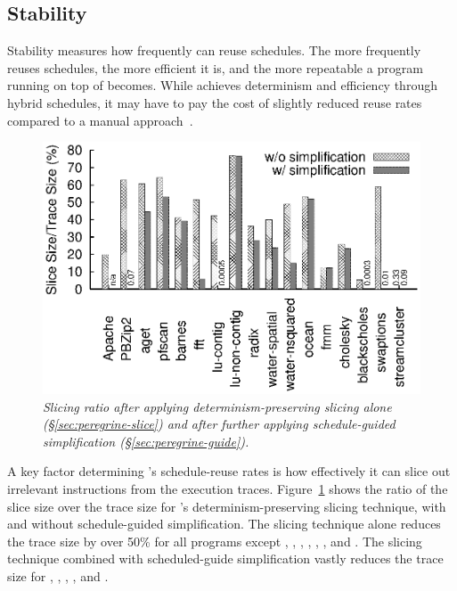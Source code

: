 \subsection{Stability} \label{sec:peregrine-stable}

Stability measures how frequently \peregrine can reuse schedules.  The more
frequently \peregrine reuses schedules, the more efficient it is, and the
more repeatable a program running on top of \peregrine becomes.  While \peregrine
achieves determinism and efficiency through hybrid schedules, it may have
to pay the cost of slightly reduced reuse rates compared to a
manual approach~\cite{cui:tern:osdi10}.




\begin{figure}[t]
\centering
\includegraphics[width=\columnwidth]{peregrine/figures/slicing.eps}
\vspace{-.3in}
\caption{{\em Slicing ratio after applying determinism-preserving slicing alone 
    (\S\ref{sec:peregrine-slice}) and after further applying schedule-guided
    simplification (\S\ref{sec:peregrine-guide}).}} \label{fig:peregrine-slice-ratio}
\vspace{-.05in}
\end{figure}

A key factor determining \peregrine's schedule-reuse rates is how effectively it
can slice out irrelevant instructions from the execution traces.
Figure~\ref{fig:peregrine-slice-ratio} shows the ratio of the slice size over the trace size for
\peregrine's determinism-preserving slicing technique, with and without
schedule-guided simplification.  The slicing technique alone reduces the
trace size by over 50\% for all programs except \pbzip, \aget, \pfscan,
\fft, \lun, \ocean, and \swaptions.  The slicing technique combined with
scheduled-guide simplification vastly reduces the trace size for \pbzip,
\aget, \fft, \luc, and \swaptions.

